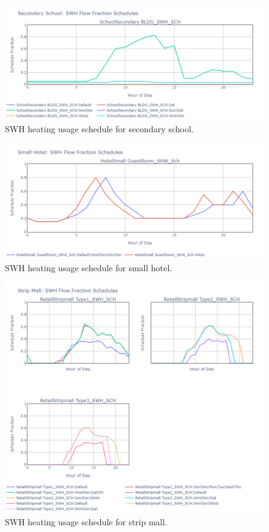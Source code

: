\begin{figure}
  \centering
  \includegraphics[width=\textwidth]{figures/swh_sched_secondary school.png}
  \caption[SWH heating usage schedule for secondary school]{SWH heating usage schedule for secondary school.}
  \label{fig:swh_sched_secondary_school}
\end{figure}

\begin{figure}
  \centering
  \includegraphics[width=\textwidth]{figures/swh_sched_small hotel.png}
  \caption[SWH heating usage schedule for small hotel]{SWH heating usage schedule for small hotel.}
  \label{fig:swh_sched_small_hotel}
\end{figure}

\begin{figure}
  \centering
  \includegraphics[width=\textwidth]{figures/swh_sched_strip mall.png}
  \caption[SWH heating usage schedule for strip mall]{SWH heating usage schedule for strip mall.}
  \label{fig:swh_sched_strip_mall}
\end{figure}

